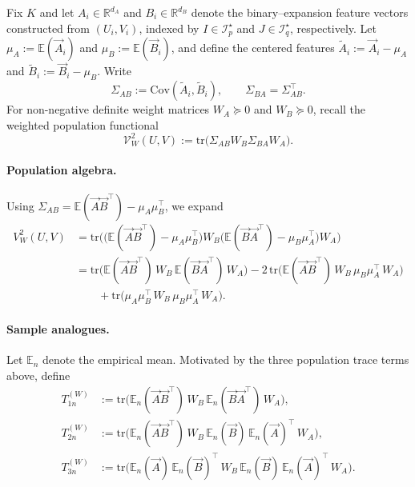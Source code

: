 \documentclass[12pt,reqno,oneside]{amsbook}
\theoremstyle{definition}
\theoremstyle{remark}
\begin{document}
Fix $K$ and let $A_i\in\mathbb R^{d_A}$ and $B_i\in\mathbb R^{d_B}$ denote the
binary--expansion feature vectors constructed from $(U_i,V_i)$, indexed by
$I\in\mathcal I_p^\star$ and $J\in\mathcal I_q^\star$, respectively.
Let $\mu_A:=\mathbb E(\vec A_i)$ and $\mu_B:=\mathbb E(\vec B_i)$, and define the centered
features $\tilde A_i:=\vec A_i-\mu_A$ and $\tilde B_i:=\vec B_i-\mu_B$.
Write
\[
\Sigma_{AB}:=\mbox{Cov}(\tilde A_i,\tilde B_i),
\qquad
\Sigma_{BA}=\Sigma_{AB}^\top.
\]
For non-negative definite weight matrices $W_A\succeq0$ and $W_B\succeq0$, recall the weighted population functional
\begin{equation}
\label{eq:Xi-weighted-pop}
\mathcal V_W^2(U,V):=\mbox{tr}\!\bigl(\Sigma_{AB}W_B\Sigma_{BA}W_A\bigr).   
\end{equation}

\paragraph{Population algebra.}
Using $\Sigma_{AB}=\mathbb E(\vec A \vec B^\top)-\mu_A\mu_B^\top$, we expand
\[
\begin{aligned}
V_W^2(U,V)
&= \mbox{tr}\!\Big(
\big(\mathbb E(\vec A \vec B^\top)-\mu_A\mu_B^\top\big)
W_B
\big(\mathbb E(\vec B \vec A^\top)-\mu_B\mu_A^\top\big)
W_A
\Big) \\
&= \mbox{tr}\!\big( \mathbb E(\vec A \vec B^\top)\,W_B\,\mathbb E(\vec B \vec A^\top)\,W_A \big)
- 2\,\mbox{tr}\!\big( \mathbb E(\vec A \vec B^\top)\,W_B\,\mu_B\mu_A^\top\,W_A \big) \\
&\qquad
+ \mbox{tr}\!\big( \mu_A\mu_B^\top\,W_B\,\mu_B\mu_A^\top\,W_A \big).
\end{aligned}
\]

\paragraph{Sample analogues.}
Let $\mathbb E_n$ denote the empirical mean. Motivated by the three population
trace terms above, define
\[
\begin{aligned}
T_{1n}^{(W)}
&:= \mbox{tr}\!\big( \mathbb E_n(\vec A\vec B^\top)\,W_B\,\mathbb E_n(\vec B\vec A^\top)\,W_A \big),\\
T_{2n}^{(W)}
&:= \mbox{tr}\!\big( \mathbb E_n(\vec A \vec B^\top)\,W_B\,\mathbb E_n(\vec B)\,\mathbb E_n(\vec A)^\top\,W_A \big),\\
T_{3n}^{(W)}
&:= \mbox{tr}\!\big( \mathbb E_n(\vec A)\,\mathbb E_n(\vec B)^\top\,W_B\,\mathbb E_n(\vec B)\,\mathbb E_n(\vec A)^\top\,W_A \big).
\end{aligned}
\]
\end{document}
